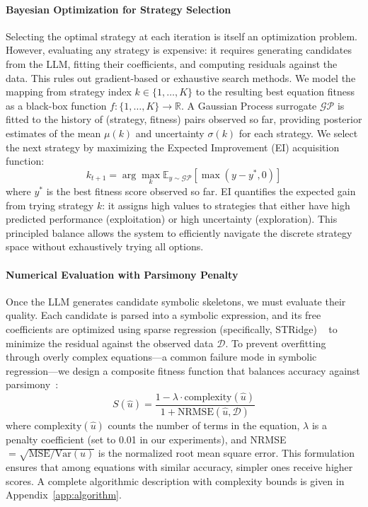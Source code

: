 \paragraph{Bayesian Optimization for Strategy Selection} Selecting the optimal strategy at each iteration is itself an optimization problem. However, evaluating any strategy is expensive: it requires generating candidates from the LLM, fitting their coefficients, and computing residuals against the data. This rules out gradient-based or exhaustive search methods.
We model the mapping from strategy index $k \in \{1, \ldots, K\}$ to the resulting best equation fitness as a black-box function $f: \{1,\ldots,K\} \rightarrow \mathbb{R}$. A Gaussian Process surrogate $\mathcal{GP}$ is fitted to the history of (strategy, fitness) pairs observed so far, providing posterior estimates of the mean $\mu(k)$ and uncertainty $\sigma(k)$ for each strategy. We select the next strategy by maximizing the Expected Improvement (EI) acquisition function:
\begin{equation}
    k_{t+1} = \arg\max_{k} \mathbb{E}_{y \sim \mathcal{GP}}\left[\max(y - y^*, 0)\right]
\end{equation}
where $y^*$ is the best fitness score observed so far. EI quantifies the expected gain from trying strategy $k$: it assigns high values to strategies that either have high predicted performance (exploitation) or high uncertainty (exploration). This principled balance allows the system to efficiently navigate the discrete strategy~\citep{baptista2018bocs} space without exhaustively trying all options.

\paragraph{Numerical Evaluation with Parsimony Penalty} Once the LLM generates candidate symbolic skeletons, we must evaluate their quality. Each candidate is parsed into a symbolic expression, and its free coefficients are optimized using sparse regression (specifically, STRidge) ~\citep{tibshirani1996lasso} to minimize the residual against the observed data $\mathcal{D}$. To prevent overfitting through overly complex equations---a common failure mode in symbolic regression---we design a composite fitness function that balances accuracy against parsimony~\citep{bartlett2024mdl,burlacu2019parsimony}:
\begin{equation}
    S(\hat{u}) = \frac{1 - \lambda \cdot \text{complexity}(\hat{u})}{1 + \text{NRMSE}(\hat{u}, \mathcal{D})}
\end{equation}
where $\text{complexity}(\hat{u})$ counts the number of terms in the equation, $\lambda$ is a penalty coefficient (set to 0.01 in our experiments), and NRMSE $= \sqrt{\text{MSE}/\text{Var}(u)}$ is the normalized root mean square error. This formulation ensures that among equations with similar accuracy, simpler ones receive higher scores. A complete algorithmic description with complexity bounds is given in Appendix~\ref{app:algorithm}.

